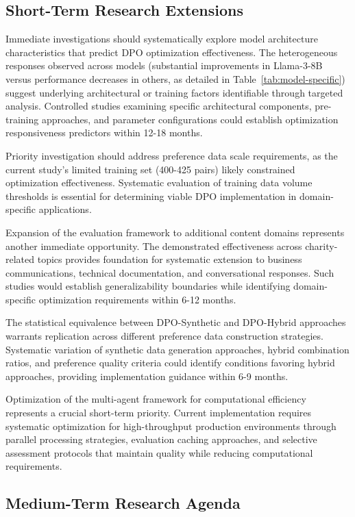 \subsection{Short-Term Research Extensions}

Immediate investigations should systematically explore model architecture characteristics that predict DPO optimization effectiveness. The heterogeneous responses observed across models (substantial improvements in Llama-3-8B versus performance decreases in others, as detailed in Table~\ref{tab:model-specific}) suggest underlying architectural or training factors identifiable through targeted analysis. Controlled studies examining specific architectural components, pre-training approaches, and parameter configurations could establish optimization responsiveness predictors within 12-18 months.

Priority investigation should address preference data scale requirements, as the current study's limited training set (400-425 pairs) likely constrained optimization effectiveness. Systematic evaluation of training data volume thresholds is essential for determining viable DPO implementation in domain-specific applications.

Expansion of the evaluation framework to additional content domains represents another immediate opportunity. The demonstrated effectiveness across charity-related topics provides foundation for systematic extension to business communications, technical documentation, and conversational responses. Such studies would establish generalizability boundaries while identifying domain-specific optimization requirements within 6-12 months.

The statistical equivalence between DPO-Synthetic and DPO-Hybrid approaches warrants replication across different preference data construction strategies. Systematic variation of synthetic data generation approaches, hybrid combination ratios, and preference quality criteria could identify conditions favoring hybrid approaches, providing implementation guidance within 6-9 months.

Optimization of the multi-agent framework for computational efficiency represents a crucial short-term priority. Current implementation requires systematic optimization for high-throughput production environments through parallel processing strategies, evaluation caching approaches, and selective assessment protocols that maintain quality while reducing computational requirements.

\subsection{Medium-Term Research Agenda}

